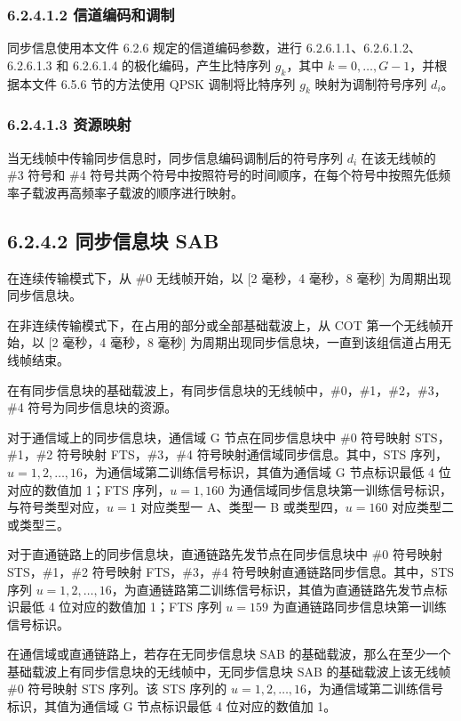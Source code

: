 \documentclass[11pt,a4paper]{ctexart}
\begin{document}
\subsubsection{6.2.4.1.2 信道编码和调制}

同步信息使用本文件 6.2.6 规定的信道编码参数，进行 6.2.6.1.1、6.2.6.1.2、6.2.6.1.3 和 6.2.6.1.4 的极化编码，产生比特序列 $g_k$，其中 $k = 0, \ldots, G-1$，并根据本文件 6.5.6 节的方法使用 QPSK 调制将比特序列 $g_k$ 映射为调制符号序列 $d_i$。

\subsubsection{6.2.4.1.3 资源映射}

当无线帧中传输同步信息时，同步信息编码调制后的符号序列 $d_i$ 在该无线帧的 \#3 符号和 \#4 符号共两个符号中按照符号的时间顺序，在每个符号中按照先低频率子载波再高频率子载波的顺序进行映射。

\subsection{6.2.4.2 同步信息块 SAB}

在连续传输模式下，从 \#0 无线帧开始，以 [2 毫秒，4 毫秒，8 毫秒] 为周期出现同步信息块。

在非连续传输模式下，在占用的部分或全部基础载波上，从 COT 第一个无线帧开始，以 [2 毫秒，4 毫秒，8 毫秒] 为周期出现同步信息块，一直到该组信道占用无线帧结束。

在有同步信息块的基础载波上，有同步信息块的无线帧中，\#0，\#1，\#2，\#3，\#4 符号为同步信息块的资源。

对于通信域上的同步信息块，通信域 G 节点在同步信息块中 \#0 符号映射 STS，\#1，\#2 符号映射 FTS，\#3，\#4 符号映射通信域同步信息。其中，STS 序列，$u = 1, 2, \ldots, 16$，为通信域第二训练信号标识，其值为通信域 G 节点标识最低 4 位对应的数值加 1；FTS 序列，$u = 1, 160$ 为通信域同步信息块第一训练信号标识，与符号类型对应，$u = 1$ 对应类型一 A、类型一 B 或类型四，$u = 160$ 对应类型二或类型三。

对于直通链路上的同步信息块，直通链路先发节点在同步信息块中 \#0 符号映射 STS，\#1，\#2 符号映射 FTS，\#3，\#4 符号映射直通链路同步信息。其中，STS 序列 $u = 1, 2, \ldots, 16$，为直通链路第二训练信号标识，其值为直通链路先发节点标识最低 4 位对应的数值加 1；FTS 序列 $u = 159$ 为直通链路同步信息块第一训练信号标识。

在通信域或直通链路上，若存在无同步信息块 SAB 的基础载波，那么在至少一个基础载波上有同步信息块的无线帧中，无同步信息块 SAB 的基础载波上该无线帧 \#0 符号映射 STS 序列。该 STS 序列的 $u = 1, 2, \ldots, 16$，为通信域第二训练信号标识，其值为通信域 G 节点标识最低 4 位对应的数值加 1。
\end{document}
